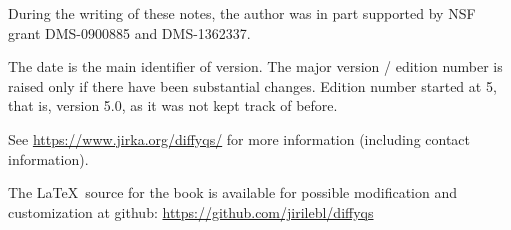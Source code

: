\documentclass[12pt]{book}
\begin{document}
\bigskip

\noindent
During the writing of these notes, 
the author was in part supported by NSF grant DMS-0900885 and
DMS-1362337.

\bigskip

\noindent
The date is the main identifier of version.  The major version / edition
number is raised only if there have been substantial changes.
Edition
number started at 5, that is, version 5.0, as it was not kept track of
before.

\bigskip

\noindent
See \url{https://www.jirka.org/diffyqs/} for more information
(including contact information).

\bigskip

\noindent
The \LaTeX\ source for the book is available
for possible modification and customization
at github: \url{https://github.com/jirilebl/diffyqs}


\diffytableofcontents

\newpage















\end{document}
